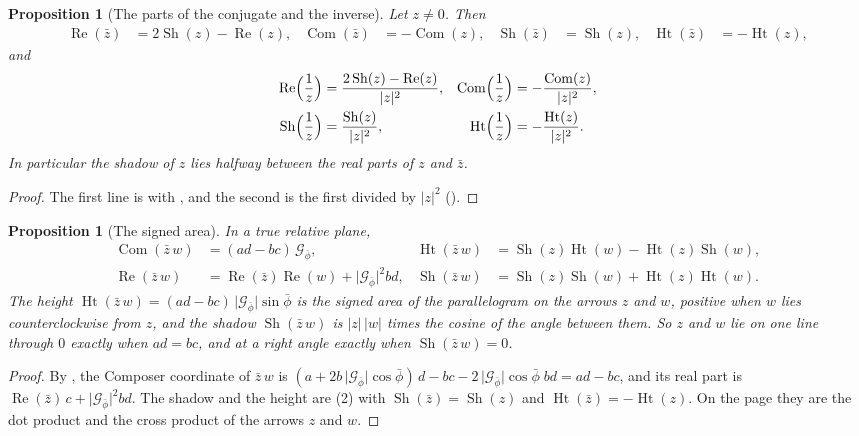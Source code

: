 \documentclass[11pt,a4paper]{amsart}
\theoremstyle{plain}
\newtheorem{proposition}[theorem]{Proposition}
\theoremstyle{definition}
\theoremstyle{remark}
\newcommand{\pb}{\bar{\phi}}                     %
\newcommand{\Gp}{\mathcal{G}_{\bar{\phi}}}       %
\renewcommand{\Re}{\operatorname{Re}}            %
\DeclareMathOperator{\Com}{Com}                  %
\DeclareMathOperator{\Sh}{Sh}                    %
\DeclareMathOperator{\Ht}{Ht}                    %
\begin{document}
\begin{proposition}[The parts of the conjugate and the inverse]\label{prop:parts-conjugate}
Let $z \neq 0$. Then
\begin{align*}
\Re(\bar{z}) &= 2\Sh(z) - \Re(z) , & \Com(\bar{z}) &= -\Com(z) , & \Sh(\bar{z}) &= \Sh(z) , & \Ht(\bar{z}) &= -\Ht(z) ,
\end{align*}
and
\begin{align*}
\Re\Bigl(\frac{1}{z}\Bigr) &= \frac{2\Sh(z) - \Re(z)}{\lvert z\rvert^2} , & \Com\Bigl(\frac{1}{z}\Bigr) &= -\frac{\Com(z)}{\lvert z\rvert^2} , \\
\Sh\Bigl(\frac{1}{z}\Bigr) &= \frac{\Sh(z)}{\lvert z\rvert^2} , & \Ht\Bigl(\frac{1}{z}\Bigr) &= -\frac{\Ht(z)}{\lvert z\rvert^2} .
\end{align*}
In particular the shadow of $z$ lies halfway between the real parts of $z$ and $\bar{z}$.
\end{proposition}

\begin{proof}
The first line is  with , and the second is the first divided by $\lvert z\rvert^2$ ().
\end{proof}

\begin{proposition}[The signed area]\label{prop:signed-area}
In a true relative plane,
\begin{align*}
\Com(\bar{z}\,w) &= (ad - bc)\,\Gp , & \Ht(\bar{z}\,w) &= \Sh(z)\Ht(w) - \Ht(z)\Sh(w) , \\
\Re(\bar{z}\,w) &= \Re(\bar{z})\Re(w) + \lvert\Gp\rvert^2bd , & \Sh(\bar{z}\,w) &= \Sh(z)\Sh(w) + \Ht(z)\Ht(w) .
\end{align*}
The height $\Ht(\bar{z}\,w) = (ad - bc)\,\lvert\Gp\rvert\sin\pb$ is the signed area of the parallelogram on the arrows $z$ and $w$, positive when $w$ lies counterclockwise from $z$, and the shadow $\Sh(\bar{z}\,w)$ is $\lvert z\rvert\,\lvert w\rvert$ times the cosine of the angle between them. So $z$ and $w$ lie on one line through $0$ exactly when $ad = bc$, and at a right angle exactly when $\Sh(\bar{z}\,w) = 0$.
\end{proposition}

\begin{proof}
By , the Composer coordinate of $\bar{z}\,w$ is $(a + 2b\,\lvert\Gp\rvert\cos\pb)\,d - bc - 2\,\lvert\Gp\rvert\cos\pb\;bd = ad - bc$, and its real part is $\Re(\bar{z})\,c + \lvert\Gp\rvert^2bd$. The shadow and the height are (2) with $\Sh(\bar{z}) = \Sh(z)$ and $\Ht(\bar{z}) = -\Ht(z)$. On the page they are the dot product and the cross product of the arrows $z$ and $w$.
\end{proof}
\end{document}
